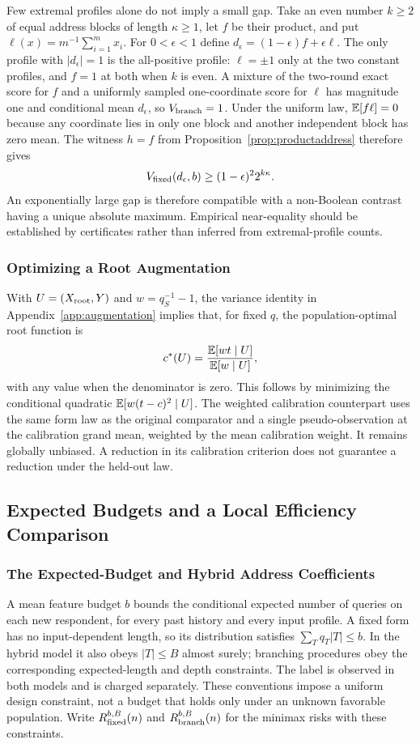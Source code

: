 Few extremal profiles alone do not imply a small gap. Take an even number $k\ge2$ of equal address blocks of length $\kappa\ge1$, let $f$ be their product, and put $\ell(x)=m^{-1}\sum_{i=1}^m x_i$. For $0<\epsilon<1$ define $d_\epsilon=(1-\epsilon)f+\epsilon\ell$. The only profile with $|d_\epsilon|=1$ is the all-positive profile: $\ell=\pm1$ only at the two constant profiles, and $f=1$ at both when $k$ is even. A mixture of the two-round exact score for $f$ and a uniformly sampled one-coordinate score for $\ell$ has magnitude one and conditional mean $d_\epsilon$, so $V_{\rm branch}=1$. Under the uniform law, $\mathbb{E}[f\ell]=0$ because any coordinate lies in only one block and another independent block has zero mean. The witness $h=f$ from Proposition~\ref{prop:productaddress} therefore gives
\[
 V_{\rm fixed}(d_\epsilon,b)\ge(1-\epsilon)^2 2^{k\kappa}.
\]
An exponentially large gap is therefore compatible with a non-Boolean contrast having a unique absolute maximum. Empirical near-equality should be established by certificates rather than inferred from extremal-profile counts.

\subsubsection{Optimizing a Root Augmentation}\label{app:weightedroot}
With $U=(X_{\rm root},Y)$ and $w=q_S^{-1}-1$, the variance identity in Appendix~\ref{app:augmentation} implies that, for fixed $q$, the population-optimal root function is
\[
 c^*(U)=\frac{\mathbb{E}[wt\mid U]}{\mathbb{E}[w\mid U]},
\]
with any value when the denominator is zero. This follows by minimizing the conditional quadratic $\mathbb{E}[w(t-c)^2\mid U]$. The weighted calibration counterpart uses the same form law as the original comparator and a single pseudo-observation at the calibration grand mean, weighted by the mean calibration weight. It remains globally unbiased. A reduction in its calibration criterion does not guarantee a reduction under the held-out law.

\subsection{Expected Budgets and a Local Efficiency Comparison}\label{app:costlocal}
\subsubsection{The Expected-Budget and Hybrid Address Coefficients}\label{app:expectedproof}
A mean feature budget $b$ bounds the conditional expected number of queries on
each new respondent, for every past history and every input profile. A fixed
form has no input-dependent length, so its distribution satisfies
$\sum_Tq_T|T|\le b$. In the hybrid model it also obeys $|T|\le B$ almost surely;
branching procedures obey the corresponding expected-length and depth
constraints. The label is observed in both models and is charged separately.
These conventions impose a uniform design constraint, not a budget that holds
only under an unknown favorable population. Write $R^{b,B}_{\rm fixed}(n)$ and
$R^{b,B}_{\rm branch}(n)$ for the minimax risks with these constraints.

